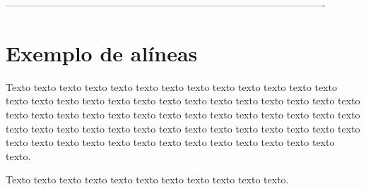 \iffalse
-------------------------------------------------------------------------------------------------



\section{Exemplo de alíneas}\label{sec:exemplo-de-algoritmos-e-figuras}

    Texto texto texto texto texto texto texto texto texto texto texto texto texto texto texto texto texto texto texto texto texto texto texto texto texto texto texto texto texto texto texto texto texto texto texto texto texto texto texto texto texto texto texto texto texto texto texto texto texto texto texto texto texto texto texto texto texto texto texto texto texto texto texto texto texto texto texto texto texto.


    Texto texto texto texto texto texto texto texto texto texto texto.


